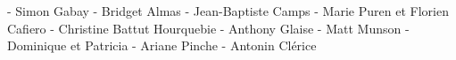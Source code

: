 - Simon Gabay
- Bridget Almas
- Jean-Baptiste Camps
- Marie Puren et Florien Cafiero
- Christine Battut Hourquebie
- Anthony Glaise
- Matt Munson
- Dominique et Patricia
- Ariane Pinche
- Antonin Clérice